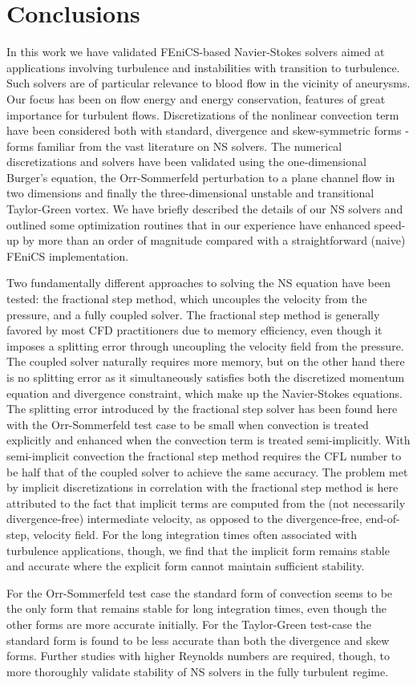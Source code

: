 \section{Conclusions}

In this work we have validated FEniCS-based Navier-Stokes solvers
aimed at applications involving turbulence and instabilities with
transition to turbulence. Such solvers are of particular relevance
to blood flow in the vicinity of aneurysms.
Our focus has been on flow energy and energy
conservation, features of great importance for turbulent
flows. Discretizations of the nonlinear convection term have been
considered both with standard, divergence and skew-symmetric forms -
forms familiar from the vast literature on NS solvers. The
numerical discretizations and solvers have been validated using the
one-dimensional Burger's equation, the Orr-Sommerfeld perturbation to
a plane channel flow in two dimensions and finally the
three-dimensional unstable and transitional Taylor-Green vortex. We
have briefly described the details of our NS solvers and outlined some
optimization routines that in our experience have enhanced speed-up by
more than an order of magnitude compared with a straightforward
(naive) FEniCS implementation.

Two fundamentally different approaches to solving the NS equation have
been tested: the fractional step method, which uncouples the velocity
from the pressure, and a fully coupled solver. The fractional step
method is generally favored by most CFD practitioners due to memory
efficiency, even though it imposes a splitting error through
uncoupling the velocity field from the pressure. The coupled solver
naturally requires more memory, but on the other hand there is no
splitting error as it simultaneously satisfies both the discretized
momentum equation and divergence constraint, which make up the
Navier-Stokes equations. The splitting error introduced by the
fractional step solver has been found here with the Orr-Sommerfeld
test case to be small when convection is treated explicitly and
enhanced when the convection term is treated semi-implicitly. With
semi-implicit convection the fractional step method requires the CFL
number to be half that of the coupled solver to achieve the same
accuracy. The problem met by implicit discretizations in correlation
with the fractional step method is here attributed to the fact that
implicit terms are computed from the (not necessarily divergence-free)
intermediate velocity, as opposed to the divergence-free, end-of-step,
velocity field. For the long integration times often associated with
turbulence applications, though, we find that the implicit form
remains stable and accurate where the explicit form cannot maintain
sufficient stability.

For the Orr-Sommerfeld test case the standard form of convection seems
to be the only form that remains stable for long integration times,
even though the other forms are more accurate initially. For the
Taylor-Green test-case the standard form is found to be less accurate
than both the divergence and skew forms. Further studies with higher
Reynolds numbers are required, though, to more thoroughly validate
stability of NS solvers in the fully turbulent regime.
